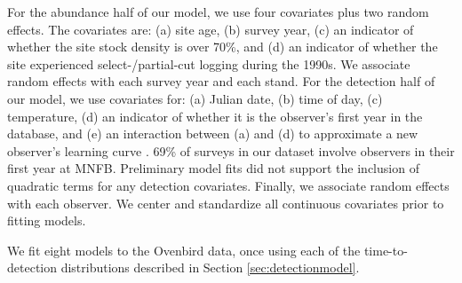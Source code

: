 \documentclass[useAMS,usenatbib,referee,12pt]{article}
\begin{document}
For the abundance half of our model, we use four covariates plus two random effects.  The covariates are: (a) site age, (b) survey year, (c) an indicator of whether the site stock density is over 70\%, and (d) an indicator of whether the site experienced select-/partial-cut logging during the 1990s.  We associate random effects with each survey year and each stand.  For the detection half of our model, we use covariates for: (a) Julian date, (b) time of day, (c) temperature, (d) an indicator of whether it is the observer's first year in the database, and (e) an interaction between (a) and (d) to approximate a new observer's learning curve \citep{Alldredge2007}.  69\% of surveys in our dataset involve observers in their first year at MNFB.  Preliminary model fits did not support the inclusion of quadratic terms for any detection covariates.  Finally, we associate random effects with each observer.  We center and standardize all continuous covariates prior to fitting models.


We fit eight models to the Ovenbird data, once using each of the time-to-detection distributions described in Section \ref{sec:detectionmodel}.
\end{document}

